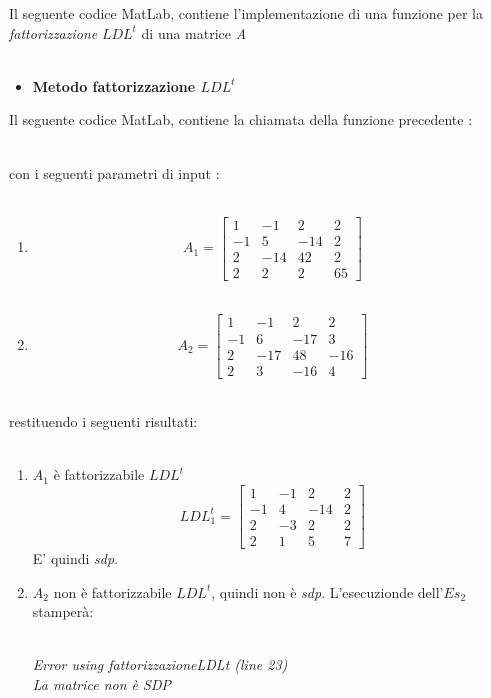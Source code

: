 \graphicspath{ {assets/cap3/es_2/} }

Il seguente codice MatLab, contiene l'implementazione di una funzione per la \textit{fattorizzazione} $LDL^t$ di una matrice \textit{A}\\\
\begin{itemize}
	\item \textbf{Metodo fattorizzazione $LDL^t$}
	      
\end{itemize}
Il seguente codice MatLab, contiene la chiamata della funzione precedente :\\\

con i seguenti parametri di input :\\\
\begin{enumerate}
	\item
	      \[
	      	A_1 =\begin{bmatrix}
	      	1  & -1  & 2   & 2  \\ 
	      	-1 & 5   & -14 & 2  \\
	      	2  & -14 & 42  & 2  \\
	      	2  & 2   & 2   & 65 
	      	\end{bmatrix}
	      \]\\
	\item
	      \[
	      	A_2 =\begin{bmatrix}
	      	1  & -1  & 2   & 2   \\ 
	      	-1 & 6   & -17 & 3   \\
	      	2  & -17 & 48  & -16 \\
	      	2  & 3   & -16 & 4   
	      	\end{bmatrix}
	      \]\\
\end{enumerate}
restituendo i seguenti risultati:\\\
\begin{enumerate}
	\item
	      $A_1$ è fattorizzabile $LDL^t$\\
	      \[
	      	LDL^t_1 =\begin{bmatrix}
	      	1  & -1  & 2   & 2  \\ 
	      	-1 & 4   & -14 & 2  \\
	      	2  & -3  & 2   & 2  \\
	      	2  & 1   & 5   & 7 
	      	\end{bmatrix}
	      \]
	      E' quindi \textit{sdp}.\\
	\item
	      $A_2$ non è fattorizzabile $LDL^t$, quindi non è \textit{sdp}. L'esecuzionde dell'$Es_2$ stamperà:\\\
	   	  \begin{center}
	   	  	\textit{Error using fattorizzazioneLDLt (line 23)}\\
	   	  	\textit{La matrice non è SDP}
	      \end{center}
\end{enumerate}